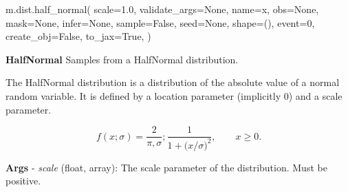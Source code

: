 \documentclass[
  letterpaper,
  DIV=11,
  numbers=noendperiod]{scrartcl}
\newenvironment{Shaded}{\begin{snugshade}}{\end{snugshade}}
\newcommand{\DecValTok}[1]{\textcolor[rgb]{0.68,0.00,0.00}{#1}}
\newcommand{\FloatTok}[1]{\textcolor[rgb]{0.68,0.00,0.00}{#1}}
\newcommand{\NormalTok}[1]{\textcolor[rgb]{0.00,0.23,0.31}{#1}}
\newcommand{\OperatorTok}[1]{\textcolor[rgb]{0.37,0.37,0.37}{#1}}
\newcommand{\StringTok}[1]{\textcolor[rgb]{0.13,0.47,0.30}{#1}}
\newcommand{\VariableTok}[1]{\textcolor[rgb]{0.07,0.07,0.07}{#1}}
\begin{document}
\begin{Shaded}
\begin{Highlighting}[]
\NormalTok{m.dist.half\_normal(}
\NormalTok{    scale}\OperatorTok{=}\FloatTok{1.0}\NormalTok{,}
\NormalTok{    validate\_args}\OperatorTok{=}\VariableTok{None}\NormalTok{,}
\NormalTok{    name}\OperatorTok{=}\StringTok{\textquotesingle{}x\textquotesingle{}}\NormalTok{,}
\NormalTok{    obs}\OperatorTok{=}\VariableTok{None}\NormalTok{,}
\NormalTok{    mask}\OperatorTok{=}\VariableTok{None}\NormalTok{,}
\NormalTok{    infer}\OperatorTok{=}\VariableTok{None}\NormalTok{,}
\NormalTok{    sample}\OperatorTok{=}\VariableTok{False}\NormalTok{,}
\NormalTok{    seed}\OperatorTok{=}\VariableTok{None}\NormalTok{,}
\NormalTok{    shape}\OperatorTok{=}\NormalTok{(),}
\NormalTok{    event}\OperatorTok{=}\DecValTok{0}\NormalTok{,}
\NormalTok{    create\_obj}\OperatorTok{=}\VariableTok{False}\NormalTok{,}
\NormalTok{    to\_jax}\OperatorTok{=}\VariableTok{True}\NormalTok{,}
\NormalTok{)}
\end{Highlighting}
\end{Shaded}

\textbf{HalfNormal} Samples from a HalfNormal distribution.

The HalfNormal distribution is a distribution of the absolute value of a
normal random variable. It is defined by a location parameter
(implicitly 0) and a scale parameter.

\[
  f(x; \sigma) = \frac{2}{\pi,\sigma} ; \frac{1}{1 + \bigl(x/\sigma\bigr)^2}, \qquad x \ge 0.
  \]

\textbf{Args} - \emph{scale} (float, array): The scale parameter of the
distribution. Must be positive.
\end{document}
